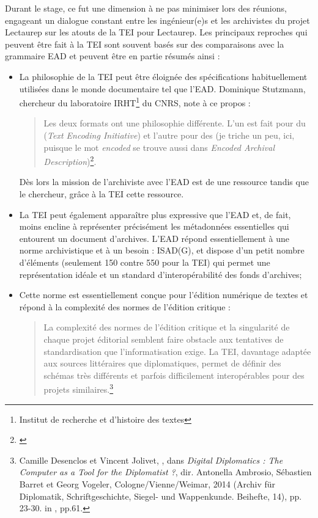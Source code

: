 Durant le stage, ce fut une dimension à ne pas minimiser lors des réunions,  engageant un dialogue constant entre les ingénieur(e)s et les archivistes du projet Lectaurep sur les atouts de la TEI pour Lectaurep. Les principaux reproches qui peuvent être fait à la TEI sont souvent basés sur des comparaisons avec la grammaire EAD et peuvent être en partie résumés ainsi :
\newpage
\begin{itemize}
    \item La philosophie de la TEI peut être éloignée des spécifications habituellement utilisées dans le monde documentaire tel que l'EAD. Dominique Stutzmann, chercheur du laboratoire IRHT\footnote{Institut de recherche et d'histoire des textes} du CNRS, note à ce propos : 
    \begin{quote}
        Les deux formats ont une philosophie différente. L'un est fait pour  du  
        (\textit{Text Encoding Initiative}) et l'autre pour  des  (je triche un peu, ici, puisque le mot \textit{encoded} se trouve aussi dans \textit{Encoded Archival Description})\footnote{\cite{stutzmann_ead-tei_2019}}.
    \end{quote}
    Dès lors la mission de l'archiviste avec l'EAD est de  une ressource tandis que le chercheur, grâce à la TEI  cette ressource.\\
    \item La TEI peut également apparaître plus expressive que l'EAD et, de fait, moins encline à représenter précisément les métadonnées essentielles qui entourent un document d'archives. L'EAD répond essentiellement à une norme archivistique et à un besoin  : ISAD(G), et dispose d'un petit nombre d'éléments (seulement 150 contre 550 pour la TEI) qui permet une représentation idéale et un standard d'interopérabilité des fonds d'archives;\\
    \item Cette norme est essentiellement conçue pour l'édition numérique de textes et répond à la complexité des normes de l'édition critique : 
    \begin{quote}
        La  complexité  des  normes  de  l'édition  critique  et  la  singularité  de  chaque  projet éditorial semblent faire obstacle aux tentatives de standardisation que l'informatisation  exige. La  TEI,
        davantage  adaptée  aux  sources  littéraires  que diplomatiques, permet de définir des schémas très différents et parfois difficilement interopérables pour des projets similaires.\footnote{Camille  Desenclos  et  Vincent  Jolivet,  ,  dans  \textit{Digital  Diplomatics : The Computer as a Tool for the Diplomatist ?},  dir.  Antonella  Ambrosio,  Sébastien  Barret  et  Georg  Vogeler, Cologne/Vienne/Weimar, 2014 (Archiv für Diplomatik, Schriftgeschichte, Siegel- und Wappenkunde. Beihefte, 14), pp. 23-30. in \cite{canteaut_actes_2020}, pp.61.} 
    \end{quote} 
\end{itemize}
